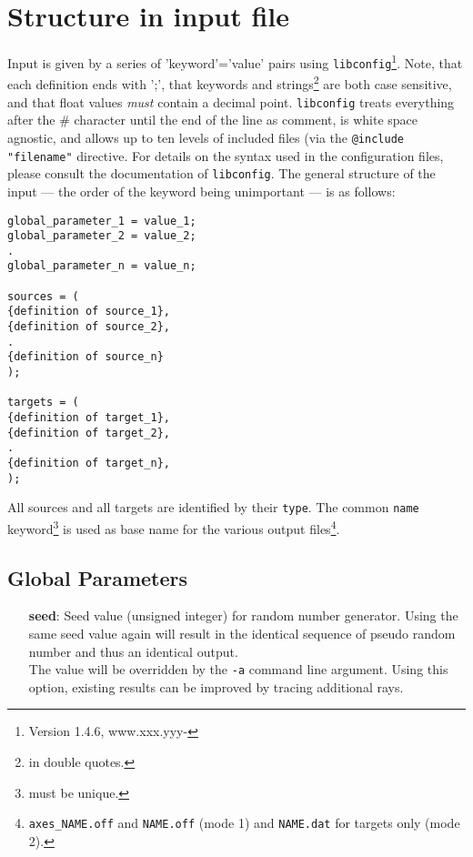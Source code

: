 \documentclass[10pt,a4paper,titlepage]{article}
\begin{document}
\section{Structure in input file}
Input is given by a series of 'keyword'='value' pairs using {\tt libconfig}\footnote{Version 1.4.6, www.xxx.yyy-}. Note, that each definition ends with ';', that keywords and strings\footnote{in double quotes.} are both case sensitive, and that float values \emph{must} contain a decimal point. {\tt libconfig} treats everything after the \# character until the end of the line as comment, is white space agnostic, and allows up to ten levels of included files (via the {\tt @include "filename"} directive. For details on the syntax used in the configuration files, please consult the documentation of {\tt libconfig}.
The general structure of the input --- the order of the keyword being unimportant --- is as follows:

\begin{verbatim}
global_parameter_1 = value_1;
global_parameter_2 = value_2;
.
global_parameter_n = value_n;

sources = (
{definition of source_1},
{definition of source_2},
.
{definition of source_n}
);

targets = (
{definition of target_1},
{definition of target_2},
.
{definition of target_n},
);

\end{verbatim}

All sources and all targets are identified by their {\tt type}. The common {\tt name} keyword\footnote{must be unique.} is used as base name for the various output files\footnote{{\tt axes\_NAME.off} and {\tt NAME.off} (mode 1) and {\tt NAME.dat} for targets only (mode 2).}.

\subsection{Global Parameters}
\begin{itemize}
\item[{\bf seed}:]{Seed value (unsigned integer) for random number generator. Using the same seed value again will result in the identical sequence of pseudo random number and thus an identical output.\\
The value will be overridden by the {\tt -a} command line argument. Using this option, existing results can be improved by tracing additional rays.}
\end{itemize}
\end{document}

